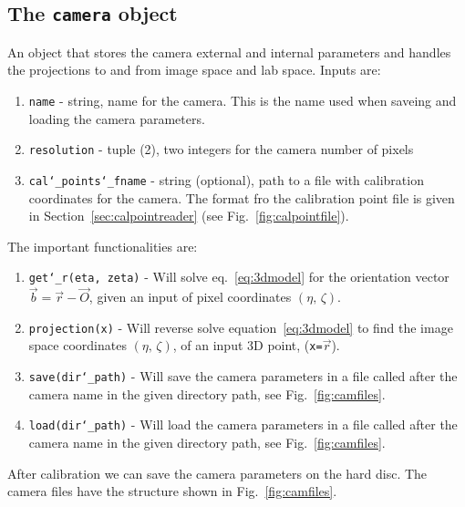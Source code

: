 \documentclass[10pt,a4paper]{article}
\begin{document}
\subsection{The \texttt{camera} object}\label{sec:camera}

An object that stores the camera external and internal parameters and handles the projections to and from image space and lab space. Inputs are:

\begin{enumerate}
	\item \texttt{name} - string, name for the camera. This is the name used when saveing and loading the camera parameters.
	\item \texttt{resolution} - tuple (2), two integers for the camera number of pixels
	\item \texttt{cal\char`_points\char`_fname} - string (optional), path to a file with calibration coordinates for the camera. The format fro the calibration point file is given in Section~\ref{sec:calpointreader} (see Fig.~\ref{fig:calpointfile}).
\end{enumerate}


The important functionalities are:


\begin{enumerate}
	\item \texttt{get\char`_r(eta, zeta)} - Will solve eq.~\ref{eq:3dmodel} for the orientation vector $\vec{b} = \vec{r} - \vec{O}$, given an input of pixel coordinates $(\eta, \, \zeta)$.
	
	\item \texttt{projection(x)} - Will reverse solve equation~\eqref{eq:3dmodel} to find the image space coordinates $(\eta, \, \zeta)$, of an input 3D point, (\texttt{x=}$\vec{r}$).
	
	\item \texttt{save(dir\char`_path)} - Will save the camera parameters in a file called after the camera name in the given directory path, see Fig.~\ref{fig:camfiles}.
	
	\item \texttt{load(dir\char`_path)} - Will load the camera parameters in a file called after the camera name in the given directory path, see Fig.~\ref{fig:camfiles}.
\end{enumerate}



After calibration we can save the camera parameters on the hard disc. The camera files have the structure shown in Fig.~\ref{fig:camfiles}.
\end{document}
